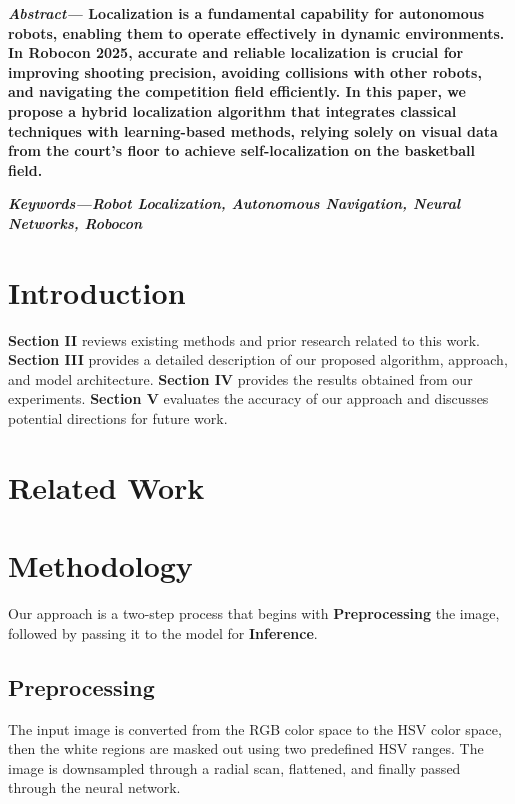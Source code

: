 \documentclass[a4paper]{article}
\begin{document}
\begin{multicols}{2}
\setlength{\columnsep}{0.5cm}

\noindent \textbf{\textit{Abstract---}
Localization is a fundamental capability for autonomous robots, enabling them 
to operate effectively in dynamic environments. In Robocon 2025, accurate and 
reliable localization is crucial for improving shooting precision, avoiding 
collisions with other robots, and navigating the competition field efficiently. 
In this paper, we propose a hybrid localization algorithm that integrates classical 
techniques with learning-based methods, relying solely on visual data from the court’s
floor to achieve self-localization on the basketball field.
}

\small	
\noindent \textbf{
  \textit{Keywords---}\textit{Robot Localization, Autonomous Navigation, Neural Networks, Robocon}}

\section{Introduction}
\textbf{Section II} reviews existing methods and prior research related to this work. 
\textbf{Section III} provides a detailed description of our proposed algorithm, approach, and model architecture. 
\textbf{Section IV} provides the results obtained from our experiments. 
\textbf{Section V} evaluates the accuracy of our approach and discusses potential directions for future work.

\section{Related Work}
\section{Methodology}
Our approach is a two-step process that begins with \textbf{Preprocessing} the image,
followed by passing it to the model for \textbf{Inference}.
\subsection{Preprocessing}
The input image is converted from the RGB color space to the HSV color space, then the white regions are masked out using two predefined HSV ranges.
The image is downsampled through a radial scan, flattened, and finally passed through the neural network.


\end{multicols}
\end{document}
